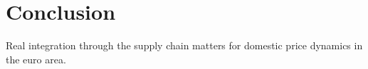 \documentclass[11pt,a4paper]{article}
\begin{document}
%

\section{Conclusion}
\label{sec:ccl}
Real integration through the supply chain matters for domestic price dynamics in the euro area.
\end{document}
